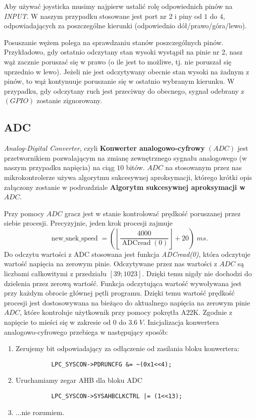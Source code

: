 \documentclass[a4paper,12pt,twoside]{article}
\theoremstyle{plain}
\theoremstyle{definition}
\theoremstyle{remark}
\begin{document}
Aby używać joysticka musimy najpierw ustalić rolę odpowiednich pinów na \textit{INPUT}. W naszym przypadku stosowane jest port nr 2 i piny od $1$ do $4$, odpowiadających za poszczególne kierunki (odpowiednio dół/prawo/góra/lewo). 

Posuszanie wężem polega na sprawdzaniu stanów poszczególnych pinów. Przykładowo, gdy ostatnio odczytany stan wysoki wystąpił na pinie nr 2, nasz wąż zacznie poruszać się w prawo (o ile jest to możliwe, tj. nie poruszał się uprzednio w lewo). Jeżeli nie jest odczytywany obecnie stan wysoki na żadnym z pinów, to wąż kontynuuje poruszanie się w ostatnio wybranym kierunku. W przypadku, gdy odczytany ruch jest przeciwny do obecnego, sygnał odebrany z $(GPIO)$ zostanie zignorowany.




\subsection{ADC}
\textit{Analog-Digital Converter}, czyli
\textbf{Konwerter analogowo-cyfrowy} $(ADC)$ jest przetwornikiem pozwalającym na zmianę zewnętrznego sygnału analogowego (w naszym przypadku napięcia) na ciąg $10$ bitów. $ADC$ na stosowanym przez nas mikrokontrolerze używa algorytmu sukcesywnej aproksymacji, którego krótki opis załączony zostanie w podrozdziale \textbf{Algorytm sukcesywnej aproksymacji w $ADC$}.

Przy pomocy $ADC$ gracz jest w stanie kontrolować prędkość poruszanej przez siebie procesji. Precyzyjnie, jeden krok procesji zajmuje
\[
\operatorname{new\_snek\_speed} =\left( \left\lfloor \frac{4000}{ \operatorname{ADCread}(0)} \right\rfloor + 20 \right) \; ms.
\]
Do odczytu wartości z ADC stosowana jest funkcja \textit{ADCread(0)}, która odczytuje wartość napięcia na zerowym pinie.
Odczytywane przez nas wartości z $ADC$ są liczbami całkowitymi z przedziału $[39;1023]$. Dzięki temu nigdy nie dochodzi do dzielenia przez zerową wartość. Funkcja odczytująca wartość wywoływana jest przy każdym obrocie głównej pętli programu. Dzięki temu wartość prędkość procesji jest dostosowywana na bieżąco do aktualnego napięcia na zerowym pinie $ADC$, które kontroluje użytkownik przy pomocy pokrętła A22K. Zgodnie z \cite{INST} napięcie to mieści się w zakresie od $0$ do $3.6 \;V$. 
Inicjalizacja konwertera analogowo-cyfrowego przebiega w następujący sposób:
\begin{enumerate}
	\item Zerujemy bit odpowiadający za odłączenie od zasilania bloku konwertera:
		\begin{verbatim}
		  LPC_SYSCON->PDRUNCFG &= ~(0x1<<4);
		\end{verbatim}
	\item Uruchamiamy zegar AHB dla bloku ADC
		\begin{verbatim}
		  LPC_SYSCON->SYSAHBCLKCTRL |= (1<<13);
		\end{verbatim}
	\item ...nie rozumiem.
\end{enumerate}
\end{document}

